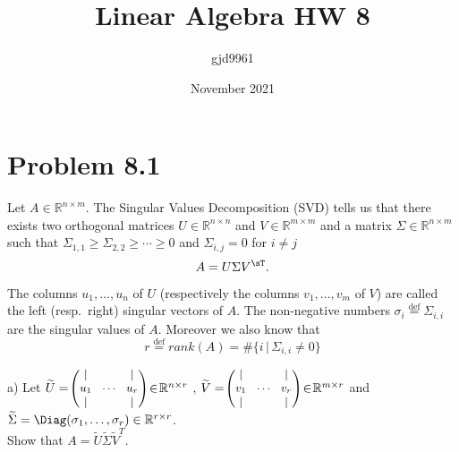 \documentclass[12pt,twoside]{article}
\title{Linear Algebra HW 8}
\author{gjd9961 }
\date{November 2021}
\newcommand*{\defeq}{\stackrel{\text{def}}{=}}
\newcommand{\R}{\mathbb{R}}
\newcommand{\rank}{rank}
\begin{document}
\maketitle


\section{Problem 8.1}
	Let $A \in \R^{n \times m}$. The Singular Values Decomposition (SVD) tells us that there exists two orthogonal matrices $U \in \R^{n \times n}$ and $V \in \R^{m \times m}$ and a matrix $\Sigma \in \R^{n \times m}$ such that $\Sigma_{1,1} \geq \Sigma_{2,2}  \geq \cdots \geq 0$ and $\Sigma_{i,j} = 0$ for $i\neq j$
	$$
	A = U \Sigma V^{\sT}.
	$$
	The columns $u_1, \dots, u_n$ of $U$ (respectively the columns $v_1, \dots, v_m$ of $V$) are called the left (resp.\ right) singular vectors of $A$. The non-negative numbers $\sigma_i \defeq \Sigma_{i,i}$ are the singular values of $A$. Moreover we also know that $$r \defeq \rank(A) = \# \{i \, | \, \Sigma_{i,i} \neq 0 \}$$
	
a) Let 
			$\widetilde{U} = \!
			{\small \begin{pmatrix}
					| & & | \\
					u_1 & \!\cdots\! & u_r \\
					| & & | 
			\end{pmatrix} } \! \in \! \R^{n \times r}$ ,
			$\widetilde{V} = \!
			{\small \begin{pmatrix}
					| & & | \\
					v_1 & \!\cdots\! & v_r \\
					| & & | 
			\end{pmatrix} } \! \in \! \R^{m \times r}$ and
			$\widetilde{\Sigma} = \Diag(\sigma_1, \dots, \sigma_r) \in \R^{r \times r}$.\\
			Show that $A = \widetilde{U}\widetilde{\Sigma}\widetilde{V}^T$.\\
			
\end{document}
